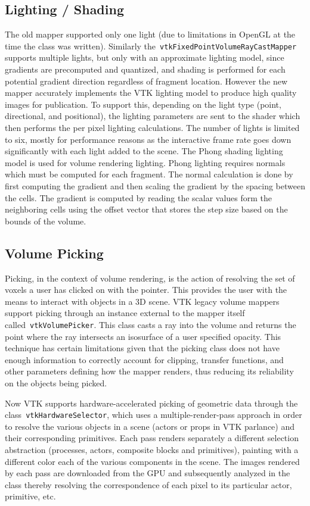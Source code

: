\subsection{Lighting / Shading}
\label{lighting}
The old mapper supported only one light (due to limitations in OpenGL at the
time the class was written). Similarly
the~\texttt{vtkFixedPointVolumeRayCastMapper} supports multiple lights, but only
with an approximate lighting model, since gradients are precomputed and
quantized, and shading is performed for each potential gradient direction
regardless of fragment location. However the new mapper accurately implements
the VTK lighting model to produce high quality images for publication. To
support this, depending on the light type (point, directional, and positional),
the lighting parameters are sent to the shader which then performs the per pixel
lighting calculations. The number of lights is limited to six, mostly for
performance reasons as the interactive frame rate goes down significantly with
each light added to the scene. The Phong shading lighting model is used for
volume rendering lighting. Phong lighting requires normals which must be
computed for each fragment. The normal calculation is done by first computing
the gradient and then scaling the gradient by the spacing between the cells. The
gradient is computed by reading the scalar values form the neighboring cells
using the offset vector that stores the step size based on the bounds of the
volume.

\subsection{Volume Picking}
\label{picking}
Picking, in the context of volume rendering, is the action of resolving the set
of voxels a user has clicked on with the pointer. This provides the user with the
means to interact with objects in a 3D scene. VTK legacy volume mappers
support picking through an instance external to the mapper itself
called~\texttt{vtkVolumePicker}.  This class casts a ray into the volume and
returns the point where the ray intersects an isosurface of a user specified
opacity.  This technique has certain limitations given that the picking class
does not have enough information to correctly account for clipping, transfer
functions, and other parameters defining how the mapper renders, thus
reducing its reliability on the objects being picked.

Now VTK supports hardware-accelerated picking of geometric data through the
class~\texttt{vtkHardwareSelector}, which uses a multiple-render-pass approach
in order to resolve the various objects in a scene (actors or props in VTK
parlance) and their corresponding primitives.  Each pass renders separately a
different selection abstraction (processes, actors, composite blocks and
primitives), painting with a different color each of the various components in
the scene.  The images rendered by each pass are downloaded from the GPU and
subsequently analyzed in the class thereby resolving the correspondence of each
pixel to its particular actor, primitive, etc.


